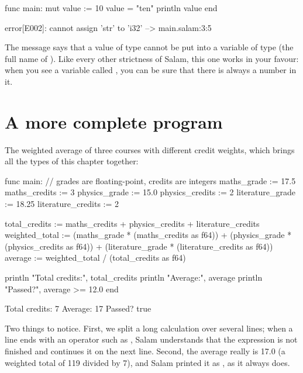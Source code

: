 \begin{salamcode}
func main:
    mut value := 10
    value = "ten"
    println value
end
\end{salamcode}

\begin{salamout}
error[E002]: cannot assign 'str' to 'i32'
 --> main.salam:3:5
\end{salamout}

The message says that a value of type  cannot be put into a
variable of type  (the full name of ). Like every
other strictness of Salam, this one works in your favour: when you see a
variable called , you can be sure that there is always a number
in it.

\section{A more complete program}

The weighted average of three courses with different credit weights, which
brings all the types of this chapter together:

\begin{salamcode}
func main:
    // grades are floating-point, credits are integers
    maths_grade := 17.5
    maths_credits := 3
    physics_grade := 15.0
    physics_credits := 2
    literature_grade := 18.25
    literature_credits := 2

    total_credits := maths_credits + physics_credits +
        literature_credits
    weighted_total := (maths_grade * (maths_credits as f64)) +
        (physics_grade * (physics_credits as f64)) +
        (literature_grade * (literature_credits as f64))
    average := weighted_total / (total_credits as f64)

    println "Total credits:", total_credits
    println "Average:", average
    println "Passed?", average >= 12.0
end
\end{salamcode}

\begin{salamout}
Total credits: 7
Average: 17
Passed? true
\end{salamout}

Two things to notice. First, we split a long calculation over several lines;
when a line ends with an operator such as \code{+}, Salam understands that
the expression is not finished and continues it on the next line. Second,
the average really is 17.0 (a weighted total of 119 divided by 7), and Salam
printed it as , as it always does.

